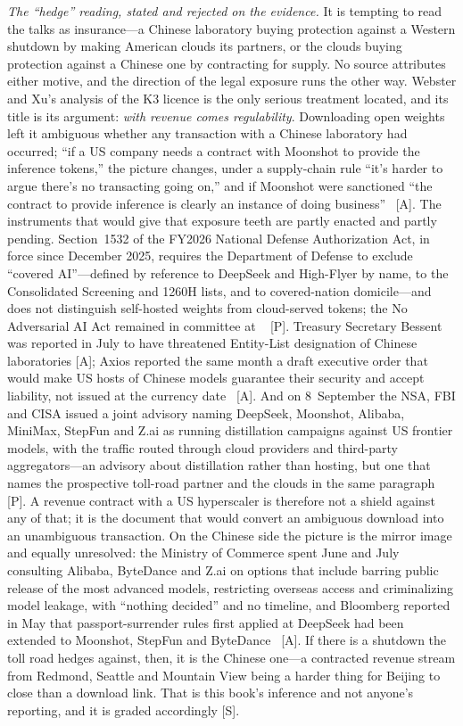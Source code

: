 \emph{The ``hedge'' reading, stated and rejected on the evidence.} It is tempting to read the talks as insurance---a Chinese laboratory buying protection against a Western shutdown by making American clouds its partners, or the clouds buying protection against a Chinese one by contracting for supply. No source attributes either motive, and the direction of the legal exposure runs the other way. Webster and Xu's analysis of the K3 licence is the only serious treatment located, and its title is its argument: \emph{with revenue comes regulability}. Downloading open weights left it ambiguous whether any transaction with a Chinese laboratory had occurred; ``if a US company needs a contract with Moonshot to provide the inference tokens,'' the picture changes, under a supply-chain rule ``it's harder to argue there's no transacting going on,'' and if Moonshot were sanctioned ``the contract to provide inference is clearly an instance of doing business''~\cite{webster-regulability} [A]. The instruments that would give that exposure teeth are partly enacted and partly pending. Section~1532 of the FY2026 National Defense Authorization Act, in force since December 2025, requires the Department of Defense to exclude ``covered AI''---defined by reference to DeepSeek and High-Flyer by name, to the Consolidated Screening and 1260H lists, and to covered-nation domicile---and does not distinguish self-hosted weights from cloud-served tokens; the No Adversarial AI Act remained in committee at \datafreeze~\cite{ndaa-1532} [P]. Treasury Secretary Bessent was reported in July to have threatened Entity-List designation of Chinese laboratories [A]; Axios reported the same month a draft executive order that would make US hosts of Chinese models guarantee their security and accept liability, not issued at the currency date~\cite{webster-regulability} [A]. And on 8~September the NSA, FBI and CISA issued a joint advisory naming DeepSeek, Moonshot, Alibaba, MiniMax, StepFun and Z.ai as running distillation campaigns against US frontier models, with the traffic routed through cloud providers and third-party aggregators---an advisory about distillation rather than hosting, but one that names the prospective toll-road partner and the clouds in the same paragraph~\cite{cisa-distillation} [P]. A revenue contract with a US hyperscaler is therefore not a shield against any of that; it is the document that would convert an ambiguous download into an unambiguous transaction. On the Chinese side the picture is the mirror image and equally unresolved: the Ministry of Commerce spent June and July consulting Alibaba, ByteDance and Z.ai on options that include barring public release of the most advanced models, restricting overseas access and criminalizing model leakage, with ``nothing decided'' and no timeline, and Bloomberg reported in May that passport-surrender rules first applied at DeepSeek had been extended to Moonshot, StepFun and ByteDance~\cite{mofcom-model-curbs} [A]. If there is a shutdown the toll road hedges against, then, it is the Chinese one---a contracted revenue stream from Redmond, Seattle and Mountain View being a harder thing for Beijing to close than a download link. That is this book's inference and not anyone's reporting, and it is graded accordingly [S].

